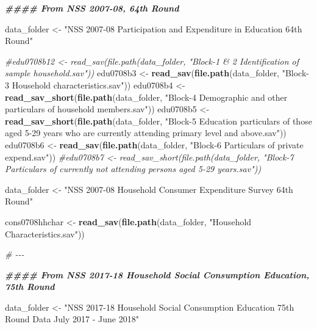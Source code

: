 \documentclass[
]{article}
\newenvironment{Shaded}{\begin{snugshade}}{\end{snugshade}}
\newcommand{\CommentTok}[1]{\textcolor[rgb]{0.56,0.35,0.01}{\textit{#1}}}
\newcommand{\DocumentationTok}[1]{\textcolor[rgb]{0.56,0.35,0.01}{\textbf{\textit{#1}}}}
\newcommand{\FunctionTok}[1]{\textcolor[rgb]{0.13,0.29,0.53}{\textbf{#1}}}
\newcommand{\NormalTok}[1]{#1}
\newcommand{\OtherTok}[1]{\textcolor[rgb]{0.56,0.35,0.01}{#1}}
\newcommand{\StringTok}[1]{\textcolor[rgb]{0.31,0.60,0.02}{#1}}
\begin{document}
\begin{Shaded}
\begin{Highlighting}[]
\DocumentationTok{\#\#\#\# From NSS 2007{-}08, 64th Round}

\NormalTok{data\_folder }\OtherTok{\textless{}{-}} \StringTok{"NSS 2007{-}08 Participation and Expenditure in Education 64th Round"}

\CommentTok{\#edu0708b12 \textless{}{-} read\_sav(file.path(data\_folder, "Block{-}1 \& 2 Identification of sample household.sav"))}
\NormalTok{edu0708b3  }\OtherTok{\textless{}{-}} \FunctionTok{read\_sav}\NormalTok{(}\FunctionTok{file.path}\NormalTok{(data\_folder, }\StringTok{"Block{-}3  Household  characteristics.sav"}\NormalTok{))}
\NormalTok{edu0708b4  }\OtherTok{\textless{}{-}} \FunctionTok{read\_sav\_short}\NormalTok{(}\FunctionTok{file.path}\NormalTok{(data\_folder, }\StringTok{"Block{-}4  Demographic and other particulars of household members.sav"}\NormalTok{))}
\NormalTok{edu0708b5  }\OtherTok{\textless{}{-}} \FunctionTok{read\_sav\_short}\NormalTok{(}\FunctionTok{file.path}\NormalTok{(data\_folder, }\StringTok{"Block{-}5  Education particulars of those aged 5{-}29 years who are currently attending primary level and above.sav"}\NormalTok{))}
\NormalTok{edu0708b6  }\OtherTok{\textless{}{-}} \FunctionTok{read\_sav}\NormalTok{(}\FunctionTok{file.path}\NormalTok{(data\_folder, }\StringTok{"Block{-}6  Particulars of private expend.sav"}\NormalTok{))}
\CommentTok{\#edu0708b7  \textless{}{-} read\_sav\_short(file.path(data\_folder, "Block{-}7  Particulars of currently not attending persons aged 5{-}29 years.sav"))}



\NormalTok{data\_folder }\OtherTok{\textless{}{-}} \StringTok{"NSS 2007{-}08 Household Consumer Expenditure Survey 64th Round"}

\NormalTok{cons0708hhchar }\OtherTok{\textless{}{-}} \FunctionTok{read\_sav}\NormalTok{(}\FunctionTok{file.path}\NormalTok{(data\_folder, }\StringTok{"Household Characteristics.sav"}\NormalTok{))}


\CommentTok{\# {-}{-}{-}}


\DocumentationTok{\#\#\#\# From NSS 2017{-}18 Household Social Consumption Education, 75th Round}

\NormalTok{data\_folder }\OtherTok{\textless{}{-}} \StringTok{"NSS 2017{-}18 Household Social Consumption Education 75th Round Data July 2017 {-} June 2018"}


\end{Highlighting}
\end{Shaded}
\end{document}
